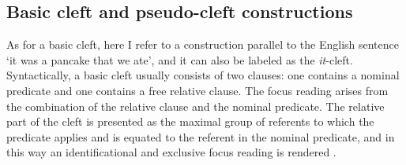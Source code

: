 \documentclass[output=paper,colorlinks,citecolor=brown,
]{langscibook}
\begin{document}
\subsection{Basic cleft and pseudo-cleft constructions}\label{teke:sec:5.1}
As for a basic cleft, here I refer to a construction parallel to the English sentence `it was a pancake that we ate', and it can also be labeled as the \textit{it}-cleft. Syntactically, a basic cleft usually consists of two clauses: one contains a nominal predicate and one contains a free relative clause. The focus reading arises from the combination of the relative clause and the nominal predicate. The relative part of the cleft is presented as the maximal group of referents to
which the predicate applies and is equated to the referent in the nominal predicate, and in this way an identificational and exclusive focus reading is rendered \citep{vanderWalManiacky2015}.
\end{document}
